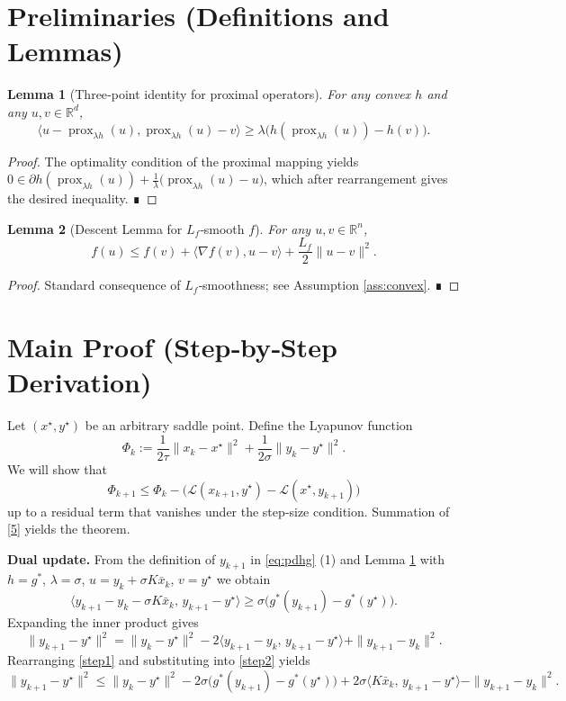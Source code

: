 \documentclass{article}
\newtheorem{lemma}{Lemma}
\begin{document}
\section*{Preliminaries (Definitions and Lemmas)}
\begin{lemma}[Three‑point identity for proximal operators]\label{lem:three-point}
For any convex $h$ and any $u,v\in\mathbb{R}^{d}$,
\[
\langle u-\operatorname{prox}_{\lambda h}(u),\operatorname{prox}_{\lambda h}(u)-v\rangle
\ge \lambda\bigl(h(\operatorname{prox}_{\lambda h}(u))-h(v)\bigr).
\]
\end{lemma}
\begin{proof}
The optimality condition of the proximal mapping yields
$0\in \partial h(\operatorname{prox}_{\lambda h}(u))+\frac{1}{\lambda}
\bigl(\operatorname{prox}_{\lambda h}(u)-u\bigr)$,
which after rearrangement gives the desired inequality. ∎
\end{proof}
\begin{lemma}[Descent Lemma for $L_f$‑smooth $f$]\label{lem:descent}
For any $u,v\in\mathbb{R}^{n}$,
\[
f(u)\le f(v)+\langle\nabla f(v),u-v\rangle+\frac{L_f}{2}\|u-v\|^{2}.
\]
\end{lemma}
\begin{proof}
Standard consequence of $L_f$‑smoothness; see Assumption \ref{ass:convex}. ∎
\end{proof}

\section*{Main Proof (Step‑by‑Step Derivation)}
Let $(x^{\star},y^{\star})$ be an arbitrary saddle point. Define the Lyapunov function
\[
\Phi_{k}:=\frac{1}{2\tau}\|x_{k}-x^{\star}\|^{2}+\frac{1}{2\sigma}\|y_{k}-y^{\star}\|^{2}.
\tag{4}
\]
We will show that
\[
\Phi_{k+1}\le \Phi_{k}
-\bigl(\mathcal{L}(x_{k+1},y^{\star})-\mathcal{L}(x^{\star},y_{k+1})\bigr)
\tag{5}
\]
up to a residual term that vanishes under the step‑size condition. Summation of \eqref{5}
yields the theorem.

\bigskip
\noindent\textbf{Dual update.}
From the definition of $y_{k+1}$ in \eqref{eq:pdhg} (1) and Lemma \ref{lem:three-point} with
$h=g^{*}$, $\lambda=\sigma$, $u=y_{k}+\sigma K\bar{x}_{k}$, $v=y^{\star}$ we obtain
\[
\langle y_{k+1}-y_{k}-\sigma K\bar{x}_{k},\,y_{k+1}-y^{\star}\rangle
\ge \sigma\bigl(g^{*}(y_{k+1})-g^{*}(y^{\star})\bigr).
\tag{6}\label{step1}
\]
Expanding the inner product gives
\[
\|y_{k+1}-y^{\star}\|^{2}
= \|y_{k}-y^{\star}\|^{2}
-2\langle y_{k+1}-y_{k},\,y_{k+1}-y^{\star}\rangle
+\|y_{k+1}-y_{k}\|^{2}.
\tag{7}\label{step2}
\]
Rearranging \eqref{step1} and substituting into \eqref{step2} yields
\[
\|y_{k+1}-y^{\star}\|^{2}
\le \|y_{k}-y^{\star}\|^{2}
-2\sigma\bigl(g^{*}(y_{k+1})-g^{*}(y^{\star})\bigr)
+2\sigma\langle K\bar{x}_{k},\,y_{k+1}-y^{\star}\rangle
-\|y_{k+1}-y_{k}\|^{2}.
\tag{8}\label{step3}
\]
\end{document}
